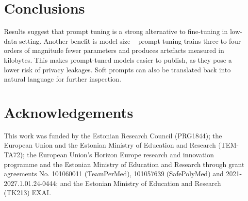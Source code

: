 \section{Conclusions}

Results suggest that prompt tuning is a strong alternative to
fine-tuning in low-data setting. Another benefit is model size --
prompt tuning trains three to four orders of magnitude fewer
parameters and produces artefacts measured in kilobytes. This makes
prompt-tuned models easier to publish, as they pose a lower risk of
privacy leakages. Soft prompts can also be translated back into
natural language for further inspection.

\section{Acknowledgements}

This work was funded by the Estonian Research Council (PRG1844); the
European Union and the Estonian Ministry of Education and Research
(TEM-TA72); the European Union’s Horizon Europe research and
innovation programme and the Estonian Ministry of Education and
Research through grant agreements No. 101060011 (TeamPerMed),
101057639 (SafePolyMed) and 2021-2027.1.01.24-0444; and the Estonian
Ministry of Education and Research (TK213) EXAI.
